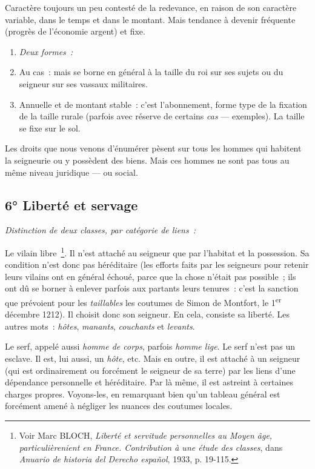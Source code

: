 \documentclass[french,twoside]{book} %
\newlength{\listmod}
\newcommand{\listhead}[1]{\hspace{-1\listmod}\emph{#1}}
\begin{document}
\noindent Caractère toujours un peu contesté de la redevance, en raison de son caractère variable, dans le temps et dans le montant. Mais tendance à devenir fréquente (progrès de l’économie argent) et fixe.\par

\begin{enumerate}[itemsep=0pt,]
\item[]\listhead{Deux formes :}
\item Au cas : mais se borne en général à la taille du roi sur ses sujets ou du seigneur sur ses vassaux militaires.
\item Annuelle et de montant stable : c’est l’abonnement, forme type de la fixation de la taille rurale (parfois avec réserve de certains \emph{cas} — exemples). La taille se fixe sur le sol.
\end{enumerate}

\noindent Les droits que nous venons d’énumérer pèsent sur tous les hommes qui habitent la seigneurie ou y possèdent des biens. Mais ces hommes ne sont pas tous au même niveau juridique — ou social.  
\label{p59}
\subsection[{6° Liberté et servage}]{6° Liberté et servage}

\begin{listalpha}[itemsep=0pt,]
\item[]\listhead{Distinction de deux classes, par catégorie de liens :}
\item Le vilain libre \footnote{ Voir Marc BLOCH, {\itshape Liberté et servitude personnelles au Moyen âge, particulièrenient en France. Contribution à une étude des classes}, dans {\itshape Anuario de historia del Derecho español}, 1933, p. 19-115.}. Il n’est attaché au seigneur que par l’habitat et la possession. Sa condition n’est donc pas héréditaire (les efforts faits par les seigneurs pour retenir leurs vilains ont en général échoué, parce que la chose n’était pas possible ; ils ont dû se borner à enlever parfois aux partants leurs tenures : c’est la sanction que prévoient pour les \emph{taillables} les coutumes de Simon de Montfort, le 1\textsuperscript{er} décembre 1212). Il choisit donc son seigneur. En cela, consiste sa liberté. Les autres mots : \emph{hôtes}, \emph{manants}, \emph{couchants} et \emph{levants}.
\item Le serf, appelé aussi \emph{homme de corps}, parfois \emph{homme lige}. Le serf n’est pas un esclave. Il est, lui aussi, un \emph{hôte}, etc. Mais en outre, il est attaché à un seigneur (qui est ordinairement ou forcément le seigneur de sa terre) par les liens d’une dépendance personnelle et héréditaire. Par là même, il est astreint à certaines charges propres. Voyons-les, en remarquant bien qu’un tableau général est forcément amené à négliger les nuances des coutumes locales.
\end{listalpha}
\end{document}
